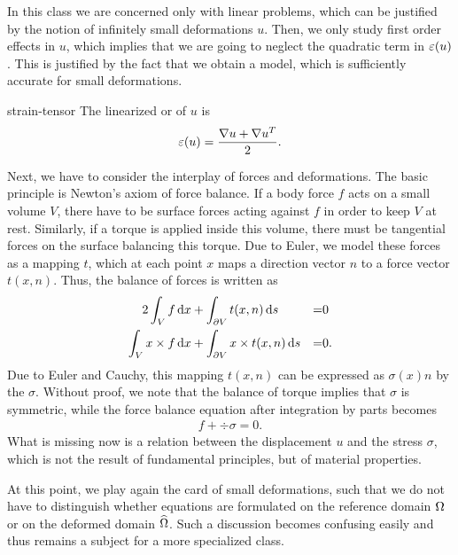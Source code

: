 \begin{intro}
  In this class we are concerned only with linear problems, which can
  be justified by the notion of infinitely small deformations
  $u$. Then, we only study first order effects in $u$, which implies
  that we are going to neglect the quadratic term in
  $\varepsilon(u)$. This is justified by the fact that we obtain a model,
  which is sufficiently accurate for small deformations.
\end{intro}

\begin{Definition}{strain-tensor}
  The linearized  or 
  of $u$ is
  \begin{gather}
    \varepsilon(u) = \frac{\nabla u + \nabla u^T}2.
  \end{gather}
\end{Definition}

\begin{intro}
  Next, we have to consider the interplay of forces and
  deformations. The basic principle is Newton's axiom of force
  balance. If a body force $f$ acts on a small volume $V$, there have
  to be surface forces acting against $f$ in order to keep $V$ at
  rest. Similarly, if a torque is applied inside this volume, there
  must be tangential forces on the surface balancing this torque. Due
  to Euler, we model these forces as a mapping $t$, which at each
  point $x$ maps a direction vector $n$ to a force vector
  $t(x,n)$. Thus, the balance of forces is written as
  \begin{alignat*}2
    \int_V f \dx &+ \int_{\d V} t(x,n) \ds &=&0\\
    \int_V x\times f \dx &+ \int_{\d V} x\times t(x,n) \ds &=&0.
  \end{alignat*}
  Due to Euler and Cauchy, this mapping $t(x,n)$ can be expressed as
  $\sigma(x)n$ by the  $\sigma$. Without proof,
  we note that the balance of torque implies that $\sigma$ is
  symmetric, while the force balance equation after integration by
  parts becomes
  \begin{gather}
    \label{eq:mixedintro:3}
    f + \div \sigma = 0.
  \end{gather}
  What is missing now is a relation between the displacement $u$ and
  the stress $\sigma$, which is not the result of fundamental
  principles, but of material properties.
\end{intro}

\begin{remark}
  At this point, we play again the card of small deformations, such
  that we do not have to distinguish whether equations are formulated
  on the reference domain $\Omega$ or on the deformed domain
  $\widehat{\Omega}$. Such a discussion becomes confusing easily and
  thus remains a subject for a more specialized class.
\end{remark}

